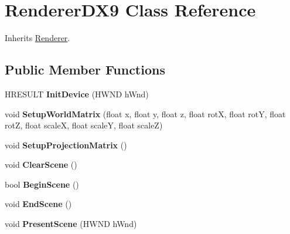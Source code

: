 \hypertarget{class_renderer_d_x9}{\section{Renderer\-D\-X9 Class Reference}
\label{class_renderer_d_x9}
}


Inherits \hyperlink{class_renderer}{Renderer}.

\subsection*{Public Member Functions}
\begin{DoxyCompactItemize}
\item 
\hypertarget{class_renderer_d_x9_a691a441a358c841dc5189325b8e0b086}{H\-R\-E\-S\-U\-L\-T {\bfseries Init\-Device} (H\-W\-N\-D h\-Wnd)}\label{class_renderer_d_x9_a691a441a358c841dc5189325b8e0b086}

\item 
\hypertarget{class_renderer_d_x9_a3b81c52feaec4900d31ba35ac1f2d95b}{void {\bfseries Setup\-World\-Matrix} (float x, float y, float z, float rot\-X, float rot\-Y, float rot\-Z, float scale\-X, float scale\-Y, float scale\-Z)}\label{class_renderer_d_x9_a3b81c52feaec4900d31ba35ac1f2d95b}

\item 
\hypertarget{class_renderer_d_x9_a7195bc2ed7ec550d8d89c3b6e23a3d77}{void {\bfseries Setup\-Projection\-Matrix} ()}\label{class_renderer_d_x9_a7195bc2ed7ec550d8d89c3b6e23a3d77}

\item 
\hypertarget{class_renderer_d_x9_affe5d73baddc5ee719a2b29a811007b6}{void {\bfseries Clear\-Scene} ()}\label{class_renderer_d_x9_affe5d73baddc5ee719a2b29a811007b6}

\item 
\hypertarget{class_renderer_d_x9_a77163ec49875c0584fc849f0f6fa14fa}{bool {\bfseries Begin\-Scene} ()}\label{class_renderer_d_x9_a77163ec49875c0584fc849f0f6fa14fa}

\item 
\hypertarget{class_renderer_d_x9_a712e654baa65e8e05163a2a336a677eb}{void {\bfseries End\-Scene} ()}\label{class_renderer_d_x9_a712e654baa65e8e05163a2a336a677eb}

\item 
\hypertarget{class_renderer_d_x9_aae9ac91351b19ee6e77d9e1d7d5c3570}{void {\bfseries Present\-Scene} (H\-W\-N\-D h\-Wnd)}\label{class_renderer_d_x9_aae9ac91351b19ee6e77d9e1d7d5c3570}


\end{DoxyCompactItemize}
